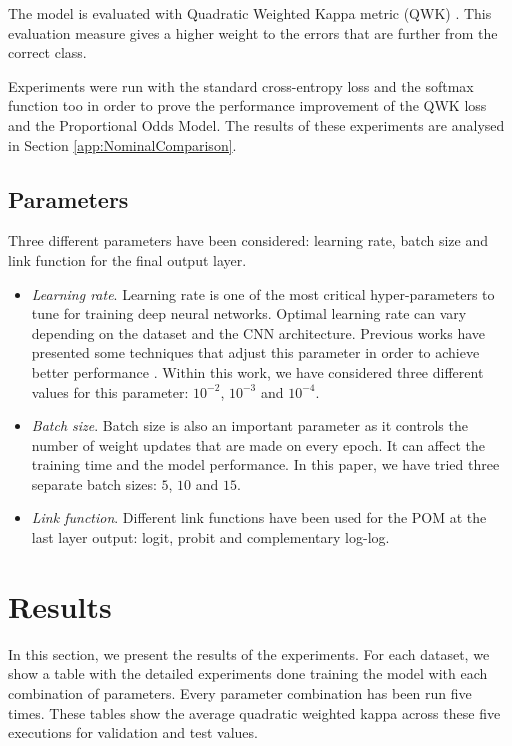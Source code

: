 \documentclass[10pt, a4paper, titlepage, twocolumn]{article}
\begin{document}
	The model is evaluated with Quadratic Weighted Kappa metric (QWK) \cite{ben2008comparison}. This evaluation measure gives a higher weight to the errors that are further from the correct class.
	
	 Experiments were run with the standard cross-entropy loss and the softmax function too in order to prove the performance improvement of the QWK loss and the Proportional Odds Model. The results of these experiments are analysed in Section \ref{app:NominalComparison}.
	
	\subsection{Parameters}
	Three different parameters have been considered: learning rate, batch size and link function for the final output layer.
	
	\begin{itemize}
		\item \textit{Learning rate}. Learning rate is one of the most critical hyper-parameters to tune for training deep neural networks. Optimal learning rate can vary depending on the dataset and the CNN architecture. Previous works have presented some techniques that adjust this parameter in order to achieve better performance \cite{smith2017cyclical}\cite{senior2013empirical}. Within this work, we have considered three different values for this parameter: $10^{-2}$, $10^{-3}$ and $10^{-4}$.
		\item \textit{Batch size}. Batch size is also an important parameter as it controls the number of weight updates that are made on every epoch. It can affect the training time and the model performance. In this paper, we have tried three separate batch sizes: $5$, $10$ and $15$.
		\item \textit{Link function}. Different link functions have been used for the POM at the last layer output: logit, probit and complementary log-log.
	\end{itemize}
	
	\section{Results}
	\label{sect:results}
	In this section, we present the results of the experiments. For each dataset, we show a table with the detailed experiments done training the model with each combination of parameters. Every parameter combination has been run five times. These tables show the average quadratic weighted kappa across these five executions for validation and test values.
	
\end{document}
